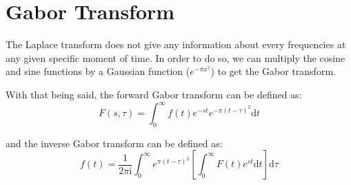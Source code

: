 \section{Gabor Transform}
The Laplace transform does not give any information about every frequencies at any given specific moment of time. 
In order to do so, we can multiply the cosine and sine functions by a Gaussian function ($e^{-\pi x^2}$) to get 
the Gabor transform. 

With that being said, the forward Gabor transform can be defined as:
\begin{equation}
    F(s,\tau) = \int_{0}^{\infty} f(t) e^{-st}e^{-\pi(t-\tau)^2} \mathrm{d}t
\end{equation}

and the inverse Gabor transform can be defined as:
\begin{equation}
    f(t) = \frac{1}{2\pi\mathrm{i}} \int_{0}^{\infty} e^{\pi(t-\tau)^2} \left[ \int_{0}^{\infty} F(t) e^{st} \mathrm{d}t  \right] \mathrm{d}\tau
\end{equation}

